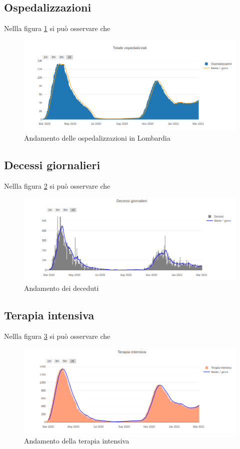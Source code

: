 \subsection{Ospedalizzazioni}
Nellla figura \ref{fig:ospedalizzati_lomb} si può osservare che
\begin{figure}[htp]
    \centering
    \includegraphics[width=12cm]{img/lomb/ospedalizzati_lomb.png}
    \caption{Andamento delle ospedalizzazioni in Lombardia}
    \label{fig:ospedalizzati_lomb}
\end{figure}

\subsection{Decessi giornalieri}
Nellla figura \ref{fig:decessi_lomb} si può osservare che
\begin{figure}[htp]
    \centering
    \includegraphics[width=12cm]{img/lomb/decessi_lomb.png}
    \caption{Andamento dei deceduti}
    \label{fig:decessi_lomb}
\end{figure}

\subsection{Terapia intensiva}
Nellla figura \ref{fig:ti_lomb} si può osservare che
\begin{figure}[htp]
    \centering
    \includegraphics[width=12cm]{img/lomb/ti_lomb.png}
    \caption{Andamento della terapia intensiva}
    \label{fig:ti_lomb}
\end{figure}

